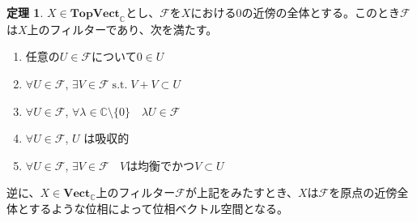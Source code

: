 ﻿\documentclass[12pt]{jsarticle}
\newcommand{\C}{\mathbb{C}}
\newcommand{\Vect}{\textbf{Vect}_{\C}}
\newcommand{\TopVect}{\textbf{TopVect}_{\C}}
\newcommand{\F}{\mathcal{F}}%
\newcommand{\single}{\{ 0 \}}%
\theoremstyle{definition}%
\newtheorem{theorem}[definition]{定理}
\begin{document}
\begin{theorem}
$X \in \TopVect$とし、$\F$を$X$における$0$の近傍の全体とする。このとき$\F$は$X$上のフィルターであり、次を満たす。
\begin{enumerate}
  \item 任意の$U \in \F$について$0 \in U$
  \item $\forall U \in \F$, $\exists V \in \F \; \text{s.t.} \; V + V \subset U$
  \item $\forall U \in \F$, $\forall \lambda \in \C \setminus \single \quad \lambda U \in \F$
  \item $\forall U \in \F$, $U$ は吸収的
  \item $\forall U \in \F$, $\exists V \in \F$ $\;$ $V$は均衡でかつ$V \subset U$
\end{enumerate}
逆に、$X \in \Vect$上のフィルター$\F$が上記をみたすとき、$X$は$\F$を原点の近傍全体とするような位相によって位相ベクトル空間となる。
\end{theorem}
\end{document}

